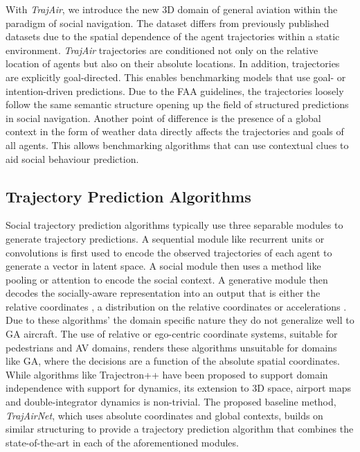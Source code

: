 \documentclass[letterpaper, 10 pt, conference]{ieeeconf}
\begin{document}
 
 With \textit{TrajAir}, we introduce the new 3D domain of general aviation within the paradigm of social navigation. The dataset differs from previously published datasets due to the spatial dependence of the agent trajectories within a static environment. \textit{TrajAir} trajectories are conditioned not only on the relative location of agents but also on their absolute locations. In addition, trajectories are explicitly goal-directed. This enables benchmarking models that use goal- or intention-driven predictions. Due to the FAA guidelines, the trajectories loosely follow the same semantic structure opening up the field of structured predictions in social navigation. Another point of difference is the presence of a global context in the form of weather data directly affects the trajectories and goals of all agents. This allows benchmarking algorithms that can use contextual clues to aid social behaviour prediction.    
 

 
\subsection{Trajectory Prediction Algorithms}
Social trajectory prediction algorithms typically use three separable modules to generate trajectory predictions. A sequential module like recurrent units \cite{lee2017desire} or convolutions \cite{nikhil2018convolutional} is first used to encode the observed trajectories of each agent to generate a vector in latent space. A social module then uses a method like pooling \cite{alahi2016social} or attention \cite{mohamed2020social} to encode the social context. A generative module then decodes the socially-aware representation into an output that is either the relative coordinates \cite{lee2017desire}, a distribution on the relative coordinates \cite{zhao2020noticing} or accelerations \cite{rhinehart2019precog}. Due to these algorithms' the domain specific nature they do not generalize well to GA aircraft. The use of relative or ego-centric coordinate systems, suitable for pedestrians and AV domains, renders these algorithms unsuitable for domains like GA, where the decisions are a function of the absolute spatial coordinates. While algorithms like Trajectron++\cite{salzmann2020trajectron++} have been proposed to support domain independence with support for dynamics, its extension to 3D space, airport maps and double-integrator dynamics is non-trivial. 
The proposed baseline method, \textit{TrajAirNet}, which uses absolute coordinates and global contexts, builds on similar structuring to provide a trajectory prediction algorithm that combines the state-of-the-art in each of the aforementioned modules.       
\end{document}
